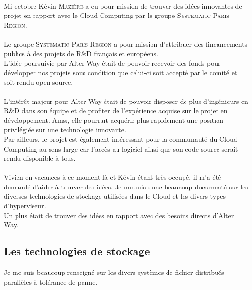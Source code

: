 \paragraph*{}
Mi-octobre Kévin \textsc{Mazière} a eu pour mission de trouver des idées innovantes de projet en rapport avec le Cloud Computing par le groupe \textsc{Systematic Paris Region}.

\paragraph*{}
Le groupe \textsc{Systematic Paris Region} a pour mission d'attribuer des fincancements publics à des projets
de R\&D français et européens.\\
L’idée poursuivie par Alter Way était de pouvoir recevoir des fonds pour développer nos projets sous condition que celui-ci soit accepté par le comité et soit rendu open-source.

\paragraph*{}
L’intérêt majeur pour Alter Way était de pouvoir disposer de plus d’ingénieurs en R\&D dans son équipe
et de profiter de l’expérience acquise sur le projet en développement.
Ainsi, elle pourrait acquérir plus rapidement une position privilégiée sur une technologie innovante.\\
Par ailleurs, le projet est également intéressant pour la communauté du Cloud Computing au sens  large car
l’accès au logiciel ainsi que son code source serait rendu disponible à tous.

\paragraph*{}
Vivien en vacances à ce moment là et Kévin étant très occupé, il m'a été demandé d'aider à trouver des idées.
Je me suis donc beaucoup documenté sur les diverses technologies de stockage utilisées dans le Cloud et les divers types d'hyperviseur.
\\
Un plus était de trouver des idées en rapport avec des besoins directs d'Alter Way.


\subsection{Les technologies de stockage}
\label{fsdpft}
\paragraph*{}
Je me suis beaucoup renseigné sur les divers systèmes de fichier distribués parallèles à tolérance de panne.

